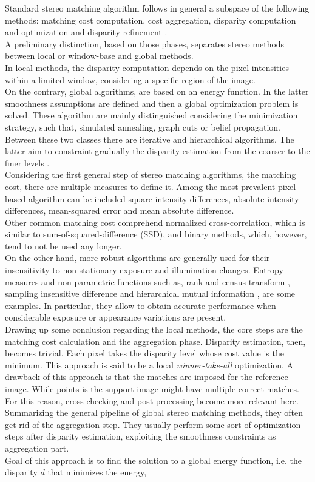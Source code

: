 Standard stereo matching algorithm follows in general a subspace of the following methods: matching cost computation, cost aggregation, disparity computation and optimization and disparity refinement \cite{Scharstein2001}.\\
A preliminary distinction, based on those phases, separates stereo methods between local or window-base and global methods.\\
In local methods, the disparity computation depends on the pixel intensities within a limited window, considering a specific region of the image.\\
On the contrary, global algorithms, are based on an energy function.
In the latter smoothness assumptions are defined and then a global optimization problem is solved. 
These algorithm are mainly distinguished considering the minimization strategy, such that, simulated annealing, graph cuts or belief propagation.\\
Between these two classes there are iterative and hierarchical algorithms. 
The latter aim to constraint gradually the disparity estimation from the coarser to the finer levels \cite{Hirschmuller2008}.\\
Considering the first general step of stereo matching algorithms, the matching cost, there are multiple measures to define it.
Among the most prevalent pixel-based algorithm can be included square intensity differences, absolute intensity differences, mean-squared error and mean absolute difference.\\
Other common matching cost comprehend normalized cross-correlation, which is similar to sum-of-squared-difference (SSD), and binary methods, which, however, tend to not be used any longer. \\
On the other hand, more robust algorithms are generally used for their insensitivity to non-stationary exposure and illumination changes. 
Entropy measures and non-parametric functions such as, rank and census transform \cite{Zabih1994}, sampling insensitive difference\cite{Birchfield1999} and hierarchical mutual information \cite{Hirschmuller2008}, are some examples.
In particular, they allow to obtain accurate performance when considerable exposure or appearance variations are present. \\
Drawing up some conclusion regarding the local methods, the core steps are the matching cost calculation and the aggregation phase. 
Disparity estimation, then, becomes trivial. 
Each pixel takes the disparity level whose cost value is the minimum. 
This approach is said to be a local \textit{winner-take-all} optimization. 
A drawback of this approach is that the matches are imposed for the reference image. 
While points is the support image might have multiple correct matches. 
For this reason, cross-checking and post-processing become more relevant here.\\
Summarizing the general pipeline of global stereo matching methods, they often get rid of the aggregation step. 
They usually perform some sort of optimization steps after disparity estimation, exploiting the smoothness constraints as aggregation part. \\
Goal of this approach is to find the solution to a global energy function, i.e. the disparity $d$ that minimizes the energy,

